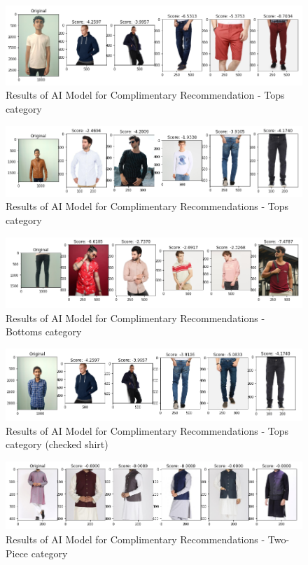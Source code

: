 \begin{figure}[H]
\includegraphics[width=12cm]{images/comp1.PNG} 
\centering
\caption{Results of AI Model for Complimentary Recommendation - Tops category}
\label{architecture}
\end{figure}

\begin{figure}[H]
\includegraphics[width=12cm]{images/comp2.PNG} 
\centering
\caption{Results of AI Model for Complimentary Recommendations - Tops category}
\label{architecture}
\end{figure}

\begin{figure}[H]
\includegraphics[width=12cm]{images/comp3.PNG} 
\centering
\caption{Results of AI Model for Complimentary Recommendations - Bottoms category}
\label{architecture}
\end{figure}

\begin{figure}[H]
\includegraphics[width=12cm]{images/comp4.PNG} 
\centering
\caption{Results of AI Model for Complimentary Recommendations - Tops category (checked shirt)}
\label{architecture}
\end{figure}

\begin{figure}[H]
\includegraphics[width=12cm]{images/comp5.PNG} 
\centering
\caption{Results of AI Model for Complimentary Recommendations - Two-Piece category}
\label{architecture}
\end{figure}

